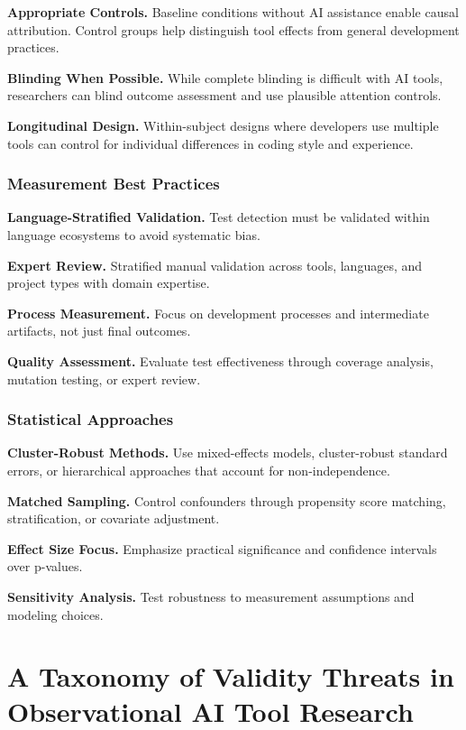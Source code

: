 \documentclass[conference]{IEEEtran}
\begin{document}
\textbf{Appropriate Controls.} Baseline conditions without AI assistance enable causal attribution. Control groups help distinguish tool effects from general development practices.

\textbf{Blinding When Possible.} While complete blinding is difficult with AI tools, researchers can blind outcome assessment and use plausible attention controls.

\textbf{Longitudinal Design.} Within-subject designs where developers use multiple tools can control for individual differences in coding style and experience.

\subsubsection{Measurement Best Practices}

\textbf{Language-Stratified Validation.} Test detection must be validated within language ecosystems to avoid systematic bias.

\textbf{Expert Review.} Stratified manual validation across tools, languages, and project types with domain expertise.

\textbf{Process Measurement.} Focus on development processes and intermediate artifacts, not just final outcomes.

\textbf{Quality Assessment.} Evaluate test effectiveness through coverage analysis, mutation testing, or expert review.

\subsubsection{Statistical Approaches}

\textbf{Cluster-Robust Methods.} Use mixed-effects models, cluster-robust standard errors, or hierarchical approaches that account for non-independence.

\textbf{Matched Sampling.} Control confounders through propensity score matching, stratification, or covariate adjustment.

\textbf{Effect Size Focus.} Emphasize practical significance and confidence intervals over p-values.

\textbf{Sensitivity Analysis.} Test robustness to measurement assumptions and modeling choices.

\section{A Taxonomy of Validity Threats in Observational AI Tool Research}
\end{document}
